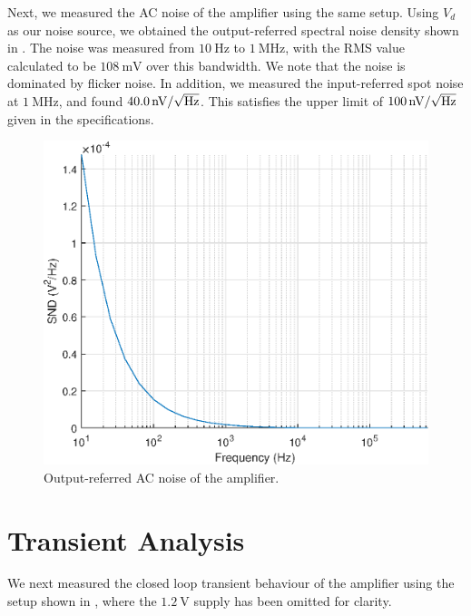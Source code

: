 \documentclass[journal,hidelinks]{IEEEtran}
\begin{document}
Next, we measured the AC noise of the amplifier using the same setup. Using $V_d$ as our noise source, we obtained the output-referred spectral noise density shown in . The noise was measured from $\SI{10}{\hertz}$ to $\SI{1}{\mega\hertz}$, with the RMS value calculated to be $\SI{108}{\milli\volt}$ over this bandwidth. We note that the noise is dominated by flicker noise. In addition, we measured the input-referred spot noise at $\SI{1}{\mega\hertz}$, and found $\SI{40.0}{\nano\volt\per\sqrt{\hertz}}$. This satisfies the upper limit of $\SI{100}{\nano\volt\per\sqrt{\hertz}}$ given in the specifications.

\begin{figure}[!htb]
  \centering
  \includegraphics[width=\columnwidth]{figures/ac_noise.eps}
  \caption{Output-referred AC noise of the amplifier.}
  \label{fig:ac_noise}
\end{figure}

\section{Transient Analysis}

We next measured the closed loop transient behaviour of the amplifier using the setup shown in , where the $\SI{1.2}{\volt}$ supply has been omitted for clarity.
\end{document}
